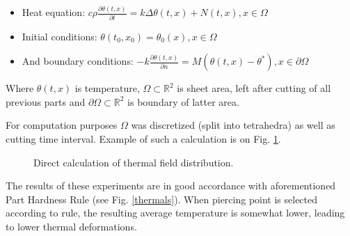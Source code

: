 \documentclass{../download/tPRS2e}
\begin{document}
\begin{itemize}
\item Heat equation: $c \rho \frac{\partial \theta (t, x)}{\partial t} = k \Delta \theta(t ,x) + N(t, x), x \in \Omega$
\item Initial conditions: $\theta(t_0, x_0) = \theta_0(x), x \in \Omega$
\item And boundary conditions: $-k \frac{\partial \theta(t, x)}{\partial n} = M(\theta(t, x) - \theta^*), x \in \partial \Omega$
\end{itemize}

Where $\theta(t, x)$ is temperature,
$\Omega \subset \mathbb{R}^2$ is sheet area, left after cutting of all previous parts and
$\partial \Omega \subset \mathbb{R}^2$ is boundary of latter area.

For computation purposes $\Omega$ was discretized (split into tetrahedra)
as well as cutting time interval.
Example of such a calculation is on Fig. \ref{thermal}.

\begin{figure}[b]
\begin{center}
\caption{Direct calculation of thermal field distribution.}\label{thermal}
\end{center}
\end{figure}

The results of these experiments are in good accordance with aforementioned Part Hardness Rule
(see Fig. \ref{thermals}).
When piercing point is selected according to rule,
the resulting average temperature is somewhat lower, leading to lower thermal deformations.
\end{document}
